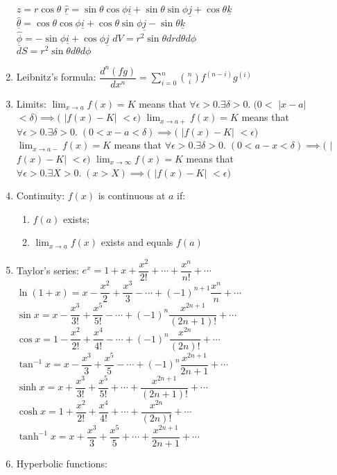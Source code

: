 \documentclass[fleqn]{article}
\begin{document}
\begin{enumerate}
		$z=r\cos\theta$\smallbreak
		$\underline{\hat{r}}=\sin\theta\cos\phi\underline{i}+\sin\theta\sin\phi\underline{j}+\cos\theta\underline{k}$\\
		$\underline{\hat{\theta}}=\cos\theta\cos\phi\underline{i}+\cos\theta\sin\phi\underline{j}-\sin\theta\underline{k}$\\
		$\underline{\hat{\phi}}=-\sin\phi\underline{i}+\cos\phi\underline{j}$\smallbreak
		$dV=r^2\sin\theta dr d\theta d\phi$\\
		$dS=r^2\sin\theta d\theta d\phi$
	\item Leibnitz's formula:\smallbreak
		$\dfrac{d^n(fg)}{dx^n}=\displaystyle\sum_{i=0}^{n}\binom{n}{i}f^{(n-i)}g^{(i)}$
	\item Limits: \smallbreak
		$\displaystyle\lim_{x\to a}f(x)=K$ means that
		$\forall\epsilon>0.\exists\delta>0.\;(0<$ $|$$x-a$$|$ $<\delta)\implies($ $|$$f(x)-K$$|$ $<\epsilon)$\smallbreak
		$\displaystyle\lim_{x\to a+}f(x)=K$ means that
		$\forall\epsilon>0.\exists\delta>0.\;(0<x-a<\delta)\implies($ $|$$f(x)-K$$|$ $<\epsilon)$\smallbreak
		$\displaystyle\lim_{x\to a-}f(x)=K$ means that
		$\forall\epsilon>0.\exists\delta>0.\;(0<a-x<\delta)\implies($ $|$$f(x)-K$$|$ $<\epsilon)$\smallbreak
		$\displaystyle\lim_{x\to\infty}f(x)=K$ means that
		$\forall\epsilon>0.\exists X>0.\;(x>X)\implies($ $|$$f(x)-K$$|$ $<\epsilon)$
	\item Continuity: $f(x)$ is continuous at $a$ if:
		\begin{enumerate}[1)]
			\item $f(a)$ exists;
			\item $\displaystyle\lim_{x\to a}f(x)$ exists and equals $f(a)$
		\end{enumerate}
	\newpage
	\item Taylor's series:\smallbreak
		$e^x=1+x+\dfrac{x^2}{2!}+\cdots+\dfrac{x^n}{n!}+\cdots$\smallbreak
		$\ln(1+x)=x-\dfrac{x^2}{2}+\dfrac{x^3}{3}-\cdots+(-1)^{n+1}\dfrac{x^n}{n}+\cdots$\smallbreak
		$\sin x=x-\dfrac{x^3}{3!}+\dfrac{x^5}{5!}-\cdots+(-1)^n\dfrac{x^{2n+1}}{(2n+1)!}+\cdots$\smallbreak
		$\cos x=1-\dfrac{x^2}{2!}+\dfrac{x^4}{4!}-\cdots+(-1)^n\dfrac{x^{2n}}{(2n)!}+\cdots$\smallbreak
		$\tan^{-1}x=x-\dfrac{x^3}{3}+\dfrac{x^5}{5}-\cdots+(-1)^n\dfrac{x^{2n+1}}{2n+1}+\cdots$\smallbreak
		$\sinh x=x+\dfrac{x^3}{3!}+\dfrac{x^5}{5!}+\cdots+\dfrac{x^{2n+1}}{(2n+1)!}+\cdots$\smallbreak
		$\cosh x=1+\dfrac{x^2}{2!}+\dfrac{x^4}{4!}+\cdots+\dfrac{x^{2n}}{(2n)!}+\cdots$\smallbreak
		$\tanh^{-1}x=x+\dfrac{x^3}{3}+\dfrac{x^5}{5}+\cdots+\dfrac{x^{2n+1}}{2n+1}+\cdots$
	\item Hyperbolic functions:\smallbreak

\end{enumerate}
\end{document}
